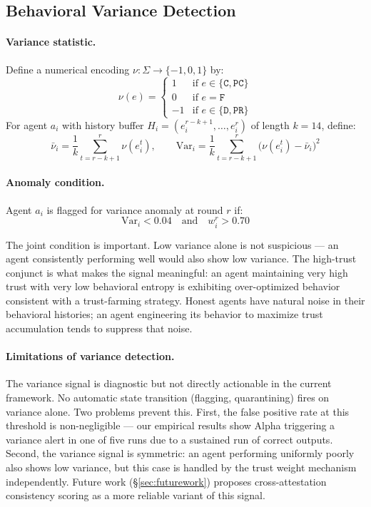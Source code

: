 \subsection{Behavioral Variance Detection}
\label{sec:variance}

\paragraph{Variance statistic.}
Define a numerical encoding $\nu: \Sigma \to \{-1, 0, 1\}$ by:
\[
\nu(e) = \begin{cases}
 1 & \text{if } e \in \{\mathtt{C}, \mathtt{PC}\} \\
 0 & \text{if } e = \mathtt{F} \\
-1 & \text{if } e \in \{\mathtt{D}, \mathtt{PR}\}
\end{cases}
\]
For agent $a_i$ with history buffer $H_i = (e_i^{r-k+1}, \ldots, e_i^r)$ of length
$k = 14$, define:
\[
\bar{\nu}_i = \frac{1}{k}\sum_{t=r-k+1}^{r} \nu(e_i^t), \qquad
\mathrm{Var}_i = \frac{1}{k}\sum_{t=r-k+1}^{r} \bigl(\nu(e_i^t) - \bar{\nu}_i\bigr)^2
\]

\paragraph{Anomaly condition.}
Agent $a_i$ is flagged for variance anomaly at round $r$ if:
\[
\mathrm{Var}_i < 0.04 \quad \text{and} \quad w_i^r > 0.70
\]

The joint condition is important.  Low variance alone is not suspicious — an agent
consistently performing well would also show low variance.  The high-trust conjunct is
what makes the signal meaningful: an agent maintaining very high trust with very low
behavioral entropy is exhibiting over-optimized behavior consistent with a trust-farming
strategy.  Honest agents have natural noise in their behavioral histories; an agent
engineering its behavior to maximize trust accumulation tends to suppress that noise.

\paragraph{Limitations of variance detection.}
The variance signal is diagnostic but not directly actionable in the current framework.
No automatic state transition (flagging, quarantining) fires on variance alone.  Two
problems prevent this.  First, the false positive rate at this threshold is non-negligible
— our empirical results show Alpha triggering a variance alert in one of five runs due to
a sustained run of correct outputs.  Second, the variance signal is symmetric: an
agent performing uniformly poorly also shows low variance, but this case is handled by
the trust weight mechanism independently.  Future work (\S\ref{sec:futurework}) proposes
cross-attestation consistency scoring as a more reliable variant of this signal.

